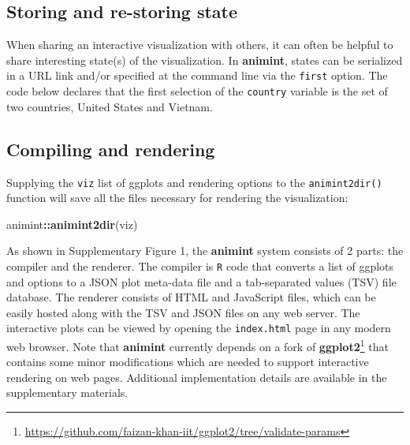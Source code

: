\documentclass[12pt,]{article}
\newenvironment{Shaded}{\begin{snugshade}}{\end{snugshade}}
\newcommand{\DataTypeTok}[1]{\textcolor[rgb]{0.13,0.29,0.53}{#1}}
\newcommand{\KeywordTok}[1]{\textcolor[rgb]{0.13,0.29,0.53}{\textbf{#1}}}
\newcommand{\NormalTok}[1]{#1}
\newcommand{\OperatorTok}[1]{\textcolor[rgb]{0.81,0.36,0.00}{\textbf{#1}}}
\newcommand{\StringTok}[1]{\textcolor[rgb]{0.31,0.60,0.02}{#1}}
\let\rmarkdownfootnote\footnote%
\def\footnote{\protect\rmarkdownfootnote}
\theoremstyle{definition}
\theoremstyle{definition}
\theoremstyle{definition}
\theoremstyle{remark}
\begin{document}
\hypertarget{storing-and-re-storing-state}{%
\subsection{Storing and re-storing
state}\label{storing-and-re-storing-state}}

When sharing an interactive visualization with others, it can often be
helpful to share interesting state(s) of the visualization. In
\textbf{animint}, states can be serialized in a URL link and/or
specified at the command line via the \texttt{first} option. The code
below declares that the first selection of the \texttt{country} variable
is the set of two countries, United States and Vietnam.

\begin{Shaded}
\end{Shaded}

\hypertarget{compiling-and-rendering}{%
\subsection{Compiling and rendering}\label{compiling-and-rendering}}

Supplying the \texttt{viz} list of ggplots and rendering options to the
\texttt{animint2dir()} function will save all the files necessary for
rendering the visualization:

\begin{Shaded}
\begin{Highlighting}[]
\NormalTok{animint}\OperatorTok{::}\KeywordTok{animint2dir}\NormalTok{(viz)}
\end{Highlighting}
\end{Shaded}

As shown in Supplementary Figure 1, the \textbf{animint} system consists
of 2 parts: the compiler and the renderer. The compiler is \texttt{R}
code that converts a list of ggplots and options to a JSON plot
meta-data file and a tab-separated values (TSV) file database. The
renderer consists of HTML and JavaScript files, which can be easily
hosted along with the TSV and JSON files on any web server. The
interactive plots can be viewed by opening the \texttt{index.html} page
in any modern web browser. Note that \textbf{animint} currently depends
on a fork of
\textbf{ggplot2}\footnote{\url{https://github.com/faizan-khan-iit/ggplot2/tree/validate-params}}
that contains some minor modifications which are needed to support
interactive rendering on web pages. Additional implementation details
are available in the supplementary materials.
\end{document}
